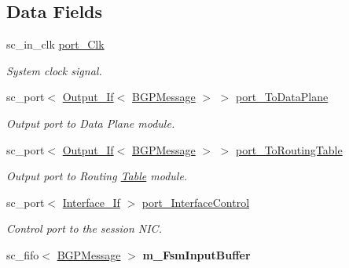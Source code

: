 \subsection*{Data Fields}
\begin{DoxyCompactItemize}
\item 
sc\-\_\-in\-\_\-clk \hyperlink{classBGPSession_adf7b7904c73267f2e6499ec4ffddee0e}{port\-\_\-\-Clk}
\begin{DoxyCompactList}\small\item\em System clock signal. \end{DoxyCompactList}\item 
sc\-\_\-port$<$ \hyperlink{classOutput__If}{Output\-\_\-\-If}$<$ \hyperlink{classBGPMessage}{B\-G\-P\-Message} $>$ $>$ \hyperlink{classBGPSession_ad7689f7d5de2710e4d9803de7e274517}{port\-\_\-\-To\-Data\-Plane}
\begin{DoxyCompactList}\small\item\em Output port to Data Plane module. \end{DoxyCompactList}\item 
\hypertarget{classBGPSession_a32b5d9138c0c9eb611e07f642b8397fc}{sc\-\_\-port$<$ \hyperlink{classOutput__If}{Output\-\_\-\-If}$<$ \hyperlink{classBGPMessage}{B\-G\-P\-Message} $>$ $>$ \hyperlink{classBGPSession_a32b5d9138c0c9eb611e07f642b8397fc}{port\-\_\-\-To\-Routing\-Table}}\label{classBGPSession_a32b5d9138c0c9eb611e07f642b8397fc}

\begin{DoxyCompactList}\small\item\em Output port to Routing \hyperlink{classTable}{Table} module. \end{DoxyCompactList}\item 
\hypertarget{classBGPSession_ac99274e961eb825ba3d4b61b52d242f4}{sc\-\_\-port$<$ \hyperlink{classInterface__If}{Interface\-\_\-\-If} $>$ \hyperlink{classBGPSession_ac99274e961eb825ba3d4b61b52d242f4}{port\-\_\-\-Interface\-Control}}\label{classBGPSession_ac99274e961eb825ba3d4b61b52d242f4}

\begin{DoxyCompactList}\small\item\em Control port to the session N\-I\-C. \end{DoxyCompactList}\item 
\hypertarget{classBGPSession_aac10fc66e70f5f0a42602b909f29adc9}{sc\-\_\-fifo$<$ \hyperlink{classBGPMessage}{B\-G\-P\-Message} $>$ {\bfseries m\-\_\-\-Fsm\-Input\-Buffer}}\label{classBGPSession_aac10fc66e70f5f0a42602b909f29adc9}

\end{DoxyCompactItemize}


